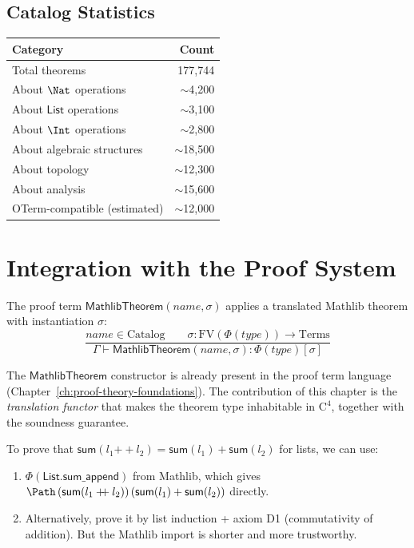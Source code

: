\subsection{Catalog Statistics}

\begin{center}
\begin{tabular}{lr}
\toprule
\textbf{Category} & \textbf{Count} \\
\midrule
Total theorems & 177,744 \\
About $\Nat$ operations & $\sim$4,200 \\
About $\mathsf{List}$ operations & $\sim$3,100 \\
About $\Int$ operations & $\sim$2,800 \\
About algebraic structures & $\sim$18,500 \\
About topology & $\sim$12,300 \\
About analysis & $\sim$15,600 \\
OTerm-compatible (estimated) & $\sim$12,000 \\
\bottomrule
\end{tabular}
\end{center}


\section{Integration with the Proof System}
\label{sec:mathlib-proof-integration}

\begin{definition}
The proof term $\mathsf{MathlibTheorem}(\mathit{name}, \sigma)$
applies a translated Mathlib theorem with instantiation $\sigma$:
\[
  \frac{\mathit{name} \in \mathrm{Catalog} \qquad
        \sigma : \mathrm{FV}(\Phi(\mathit{type})) \to \mathrm{Terms}}
       {\Gamma \vdash \mathsf{MathlibTheorem}(\mathit{name}, \sigma) :
        \Phi(\mathit{type})[\sigma]}
\]
\end{definition}

\begin{remark}
The $\mathsf{MathlibTheorem}$ constructor is already present in the
proof term language (Chapter~\ref{ch:proof-theory-foundations}).  The
contribution of this chapter is the \emph{translation functor} that
makes the theorem type inhabitable in $\mathrm{C}^4$, together with
the soundness guarantee.
\end{remark}

\begin{example}
To prove that $\mathsf{sum}(l_1 \mathbin{+\!\!+} l_2) =
\mathsf{sum}(l_1) + \mathsf{sum}(l_2)$ for lists, we can use:
\begin{enumerate}
\item $\Phi(\mathsf{List.sum\_append})$ from Mathlib, which gives
  $\Path\, (\mathsf{sum}(l_1 \mathbin{+\!\!+} l_2))\,
  (\mathsf{sum}(l_1) + \mathsf{sum}(l_2))$ directly.
\item Alternatively, prove it by list induction + axiom D1 (commutativity
  of addition).  But the Mathlib import is shorter and more trustworthy.
\end{enumerate}
\end{example}
